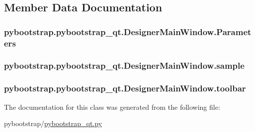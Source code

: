\subsection{Member Data Documentation}
\hypertarget{classpybootstrap_1_1pybootstrap__qt_1_1DesignerMainWindow_aba54785800dfd17638dfe781ed28823e}{
\subsubsection[{Parameters}]{\setlength{\rightskip}{0pt plus 5cm}pybootstrap.\-pybootstrap\-\_\-qt.\-Designer\-Main\-Window.\-Parameters}}\label{classpybootstrap_1_1pybootstrap__qt_1_1DesignerMainWindow_aba54785800dfd17638dfe781ed28823e}
\hypertarget{classpybootstrap_1_1pybootstrap__qt_1_1DesignerMainWindow_a8779023c02f3c03aa0f50a5c823a27f2}{
\subsubsection[{sample}]{\setlength{\rightskip}{0pt plus 5cm}pybootstrap.\-pybootstrap\-\_\-qt.\-Designer\-Main\-Window.\-sample}}\label{classpybootstrap_1_1pybootstrap__qt_1_1DesignerMainWindow_a8779023c02f3c03aa0f50a5c823a27f2}
\hypertarget{classpybootstrap_1_1pybootstrap__qt_1_1DesignerMainWindow_ad64bb50b3c27b0371fb4a1dda77a4f41}{
\subsubsection[{toolbar}]{\setlength{\rightskip}{0pt plus 5cm}pybootstrap.\-pybootstrap\-\_\-qt.\-Designer\-Main\-Window.\-toolbar}}\label{classpybootstrap_1_1pybootstrap__qt_1_1DesignerMainWindow_ad64bb50b3c27b0371fb4a1dda77a4f41}


The documentation for this class was generated from the following file\-:\begin{DoxyCompactItemize}
\item 
pybootstrap/\hyperlink{pybootstrap__qt_8py}{pybootstrap\-\_\-qt.\-py}\end{DoxyCompactItemize}
